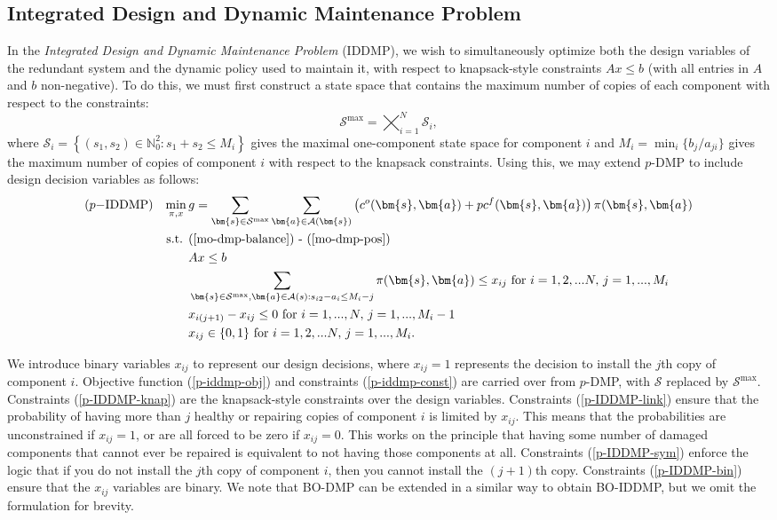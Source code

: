 \documentclass[11pt,authoryear,a4paper]{article}
\newcommand{\NN}{\mathbb{N}}
\theoremstyle{definition}
\begin{document}
\subsection{Integrated Design and Dynamic Maintenance Problem}
\label{paper1:formulation:int}
In the \emph{Integrated Design and Dynamic Maintenance Problem} (IDDMP), we wish to simultaneously optimize both the design variables of the redundant system and the dynamic policy used to maintain it, with respect to knapsack-style constraints $Ax\leq b$ (with all entries in $A$ and $b$ non-negative). To do this, we must first construct a state space that contains the maximum number of copies of each component with respect to the constraints:
$$\mathcal{S}^{\max} = \bigtimes_{i=1}^N \mathcal{S}_i,$$
where $\mathcal{S}_i =  \left\{(s_1,s_2)\in\NN_0^2:s_1 + s_2 \leq M_i\right\}$ gives the maximal one-component state space for component $i$ and $M_i = \min_i\{b_j/a_{ji}\}$ gives the maximum number of copies of component $i$ with respect to the knapsack constraints. Using this, we may extend $p$-DMP to include design decision variables as follows:
\begin{align}
    &\text{($p-$IDDMP)}&\min_{\pi,x}\, &g = \sum_{\bm{s}\in \mathcal{S}^{\max}}\sum_{\bm{a}\in \mathcal{A}(\bm{s})}\left(c^o(\bm{s},\bm{a}) + pc^f(\bm{s},\bm{a})\right)\pi(\bm{s},\bm{a}) \label{p-iddmp-obj}\\
    &&\text{s.t. } &\text{(\ref{mo-dmp-balance}) - (\ref{mo-dmp-pos})} \label{p-iddmp-const}\\
    &&& Ax\leq b \label{p-IDDMP-knap}\\
    &&& \sum_{\bm{s}\in \mathcal{S}^{\max},\bm{a}\in\mathcal{A}(s): s_{i2} - a_i \leq M_i - j}\pi(\bm{s},\bm{a}) \leq x_{ij} \text{ for }i=1,2,...N,\,j=1,...,M_i\label{p-IDDMP-link}\\
    &&&x_{i(j+1)} - x_{ij} \leq 0 \text{ for }i=1,...,N,\,j=1,...,M_i - 1\ \label{p-IDDMP-sym}\\ 
    &&& x_{ij}\in\{0,1\} \text{ for }i=1,2,...N,\,j=1,...,M_i \label{p-IDDMP-bin}.
\end{align}

We introduce binary variables $x_{ij}$ to represent our design decisions, where $x_{ij} = 1$ represents the decision to install the $j$th copy of component $i$. Objective function (\ref{p-iddmp-obj}) and constraints (\ref{p-iddmp-const}) are carried over from $p$-DMP, with $\mathcal{S}$ replaced by $\mathcal{S}^{\max}$. Constraints (\ref{p-IDDMP-knap}) are the knapsack-style constraints over the design variables. Constraints (\ref{p-IDDMP-link}) ensure that the probability of having more than $j$ healthy or repairing copies of component $i$ is limited by $x_{ij}$. This means that the probabilities are unconstrained if $x_{ij} = 1$, or are all forced to be zero if $x_{ij} = 0$. This works on the principle that having some number of damaged components that cannot ever be repaired is equivalent to not having those components at all. Constraints (\ref{p-IDDMP-sym}) enforce the logic that if you do not install the $j$th copy of component $i$, then you cannot install the $(j+1)$th copy. Constraints (\ref{p-IDDMP-bin}) ensure that the $x_{ij}$ variables are binary. We note that BO-DMP can be extended in a similar way to obtain BO-IDDMP, but we omit the formulation for brevity. 
\end{document}
